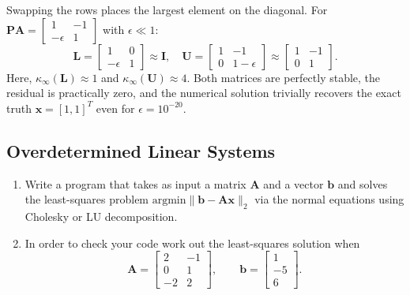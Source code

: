 \begin{solution}
	Swapping the rows places the largest element on the diagonal. For
	$\mathbf{PA} = \begin{bmatrix} 1 & -1 \\ -\epsilon & 1 \end{bmatrix}$ with
	$\epsilon \ll 1$:
	\[
		\mathbf{L} = \begin{bmatrix} 1 & 0 \\ -\epsilon & 1 \end{bmatrix}
		\approx \mathbf{I}, \quad \mathbf{U} = \begin{bmatrix} 1 & -1 \\ 0 & 1 -
		                \epsilon\end{bmatrix} \approx \begin{bmatrix} 1 & -1 \\ 0 & 1 \end{bmatrix}.
	\]
	Here, $\kappa_\infty(\mathbf{L}) \approx 1$ and $\kappa_\infty(\mathbf{U})
		\approx 4$. Both matrices are perfectly stable, the residual is practically
	zero, and the numerical solution trivially recovers the exact truth $\mathbf{x}
		=[1, 1]^T$ even for $\epsilon=10^{-20}$.

\end{solution}

\subsection{Overdetermined Linear Systems}

\begin{exercise}

	\begin{enumerate}[label=(\alph*)]
		\item Write a program that takes as input a matrix $\mathbf{A}$ and a vector
		      $\mathbf{b}$ and solves the least-squares problem $\text{argmin}\| \mathbf{b}-
			      \mathbf{A} \mathbf{x}\|_2$ via the normal equations using Cholesky or LU
		      decomposition.

		\item In order to check your code work out the least-squares solution when
		      \[
			      \mathbf{A} = \begin{bmatrix}
				      2  & -1 \\
				      0  & 1  \\
				      -2 & 2
			      \end{bmatrix}, \qquad \mathbf{b} =
			      \begin{bmatrix}
				      1 \\-5\\6
			      \end{bmatrix}.
		      \]
	\end{enumerate}

\end{exercise}

